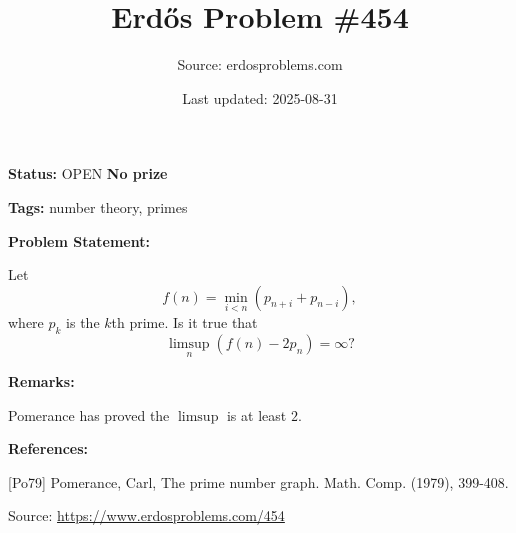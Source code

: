 \documentclass{article}
\title{Erd\H{o}s Problem \#454}
\date{Last updated: 2025-08-31}
\author{Source: erdosproblems.com}
\begin{document}
\maketitle

\noindent\textbf{Status:} OPEN \quad \textbf{No prize}

\noindent\textbf{Tags:} number theory, primes

\medskip
\noindent\textbf{Problem Statement:}

Let\[f(n) = \min_{i<n} (p_{n+i}+p_{n-i}),\]where $p_k$ is the $k$th prime. Is it true that\[\limsup_n (f(n)-2p_n)=\infty?\]

\bigskip
\noindent\textbf{Remarks:}

Pomerance \cite{Po79} has proved the $\limsup$ is at least $2$.

\bigskip
\noindent\textbf{References:}

[Po79] Pomerance, Carl, The prime number graph. Math. Comp. (1979), 399-408.

\bigskip
\noindent\small{Source: \url{https://www.erdosproblems.com/454}}
\end{document}
